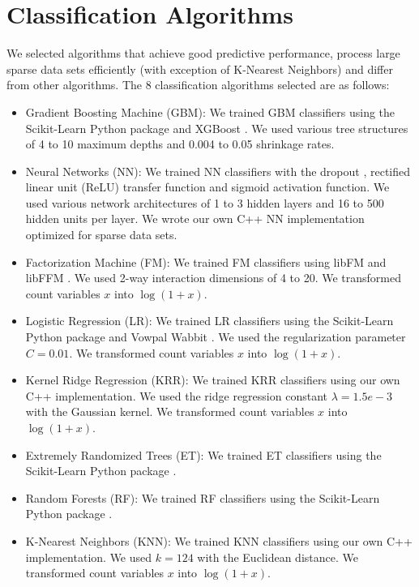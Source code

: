 \section{Classification Algorithms}
We selected algorithms that achieve good predictive performance, process large sparse data sets efficiently (with exception of K-Nearest Neighbors) and differ from other algorithms.  The 8 classification algorithms selected are as follows:
\begin{itemize}
\item Gradient Boosting Machine (GBM): We trained GBM classifiers using the Scikit-Learn Python package \cite{scikit-learn} and XGBoost \cite{chen2015xgboost}.  We used various tree structures of 4 to 10 maximum depths and 0.004 to 0.05 shrinkage rates.
\item Neural Networks (NN): We trained NN classifiers with the dropout \cite{srivastava2014dropout}, rectified linear unit (ReLU) \cite{dahl2013improving} transfer function and sigmoid activation function.  We used various network architectures of 1 to 3 hidden layers and 16 to 500 hidden units per layer.  We wrote our own C++ NN implementation optimized for sparse data sets.  
\item Factorization Machine (FM): We trained FM classifiers using libFM \cite{rendle2012factorization} and libFFM \cite{libffm}.  We used 2-way interaction dimensions of 4 to 20.  We transformed count variables $x$ into $\log{(1 + x)}$.
\item Logistic Regression (LR): We trained LR classifiers using the Scikit-Learn Python package \cite{scikit-learn} and Vowpal Wabbit \cite{langford2007vowpal}.  We used the regularization parameter $C=0.01$.  We transformed count variables $x$ into $\log{(1 + x)}$.
\item Kernel Ridge Regression (KRR): We trained KRR classifiers using our own C++ implementation.  We used the ridge regression constant $\lambda=1.5e-3$ with the Gaussian kernel.  We transformed count variables $x$ into $\log{(1 + x)}$.
\item Extremely Randomized Trees (ET): We trained ET classifiers using the Scikit-Learn Python package \cite{scikit-learn}.
\item Random Forests (RF): We trained RF classifiers using the Scikit-Learn Python package \cite{scikit-learn}.
\item K-Nearest Neighbors (KNN): We trained KNN classifiers using our own C++ implementation.  We used $k=124$ with the Euclidean distance.  We transformed count variables $x$ into $\log{(1 + x)}$.
\end{itemize}